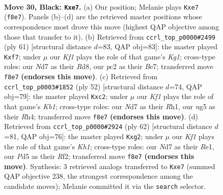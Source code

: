 \documentclass[11pt]{article}
\begin{document}
\clearpage

\begin{figure}[p]\centering
\begin{subfigure}{0.46\textwidth}\centering
\resizebox{\linewidth}{!}{%
\newchessgame
\chessboard[
  setfen={2b2k2/P1pnQp1p/2r5/3p2N1/5P2/8/2P3P1/R4RK1 b - - 0 30},
  showmover=false,
  pgfstyle=straightmove, color=movearrow, markmove={f8-e7}
]}
\caption{}
\end{subfigure}\hfill
\begin{subfigure}{0.46\textwidth}\centering
\resizebox{\linewidth}{!}{%
\newchessgame
\chessboard[
  setfen={3r2k1/4bQp1/2p5/p4p1p/1n6/1P6/4B1PP/2B2RK1 b - - 0 31},
  showmover=false,
  pgfstyle=straightmove, color=movearrow, markmove={g8-f7}
]}
\caption{}
\end{subfigure}
\\[4pt]
\begin{subfigure}{0.46\textwidth}\centering
\resizebox{\linewidth}{!}{%
\newchessgame
\chessboard[
  setfen={r4rk1/p6p/4p3/2p2pP1/7R/8/PPq2P2/1K5R w - - 0 27},
  showmover=false,
  pgfstyle=straightmove, color=movearrow, markmove={b1-c2}
]}
\caption{}
\end{subfigure}\hfill
\begin{subfigure}{0.46\textwidth}\centering
\resizebox{\linewidth}{!}{%
\newchessgame
\chessboard[
  setfen={2k4r/3r1p2/1p2p2P/2p3P1/p1n2B1P/8/5Rq1/4R2K w - - 0 32},
  showmover=false,
  pgfstyle=straightmove, color=movearrow, markmove={h1-g2}
]}
\caption{}
\end{subfigure}
\caption{\textbf{Move 30, Black: \texttt{Kxe7}.} (a) Our position; Melanie plays \texttt{Kxe7} (\texttt{f8e7}). Panels (b)--(d) are the retrieved master positions whose correspondence most drove this move (highest QAP objective among those that transfer to it). (b) Retrieved from \texttt{ccrl\_top\_p0000\#2499} (ply 61) [structural distance $d$=83, QAP obj=83]: the master played \texttt{Kxf7}; under $\mu$ our \emph{Kf1} plays the role of that game's \emph{Kg1}; cross-type roles: our \emph{N}d7 as their \emph{R}d8, our \emph{p}c2 as their \emph{B}e7; transferred move \texttt{f8e7} \textbf{(endorses this move)}. (c) Retrieved from \texttt{ccrl\_top\_p0003\#1852} (ply 52) [structural distance $d$=74, QAP obj=79]: the master played \texttt{Kxc2}; under $\mu$ our \emph{Kf1} plays the role of that game's \emph{Kb1}; cross-type roles: our \emph{N}d7 as their \emph{R}h1, our \emph{n}g5 as their \emph{R}h4; transferred move \texttt{f8e7} \textbf{(endorses this move)}. (d) Retrieved from \texttt{ccrl\_top\_p0000\#2924} (ply 62) [structural distance $d$=81, QAP obj=76]: the master played \texttt{Kxg2}; under $\mu$ our \emph{Kf1} plays the role of that game's \emph{Kh1}; cross-type roles: our \emph{N}d7 as their \emph{R}e1, our \emph{P}d5 as their \emph{R}f2; transferred move \texttt{f8e7} \textbf{(endorses this move)}. Synthesis: 3 retrieved analogs transferred to \texttt{Kxe7} (summed QAP objective 238, the strongest correspondence among the candidate moves); Melanie committed it via the \texttt{search} selector.}
\label{fig:thought-m59}
\end{figure}
\end{document}

